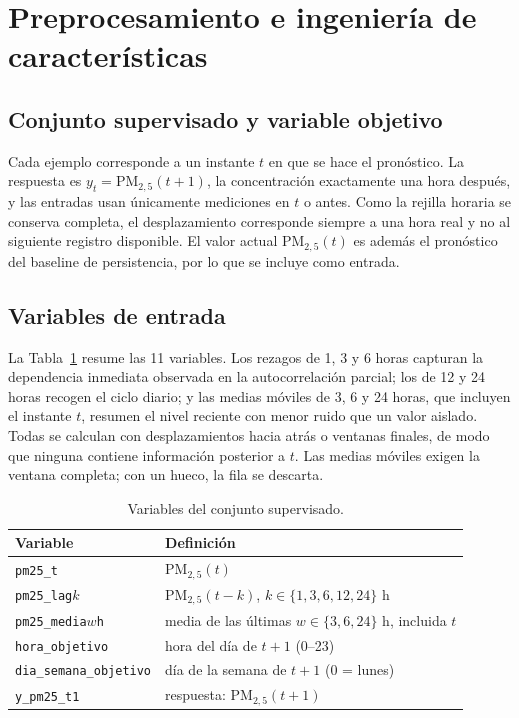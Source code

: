 
\section{Preprocesamiento e ingeniería de características}
\label{sec:preproc}

\subsection{Conjunto supervisado y variable objetivo}

Cada ejemplo corresponde a un instante $t$ en que se hace el pronóstico. La respuesta es $y_t=\mathrm{PM}_{2{,}5}(t+1)$, la concentración exactamente una hora después, y las entradas usan únicamente mediciones en $t$ o antes. Como la rejilla horaria se conserva completa, el desplazamiento corresponde siempre a una hora real y no al siguiente registro disponible. El valor actual $\mathrm{PM}_{2{,}5}(t)$ es además el pronóstico del baseline de persistencia, por lo que se incluye como entrada.

\subsection{Variables de entrada}

La Tabla~\ref{tab:vars} resume las 11 variables. Los rezagos de 1, 3 y 6 horas capturan la dependencia inmediata observada en la autocorrelación parcial; los de 12 y 24 horas recogen el ciclo diario; y las medias móviles de 3, 6 y 24 horas, que incluyen el instante $t$, resumen el nivel reciente con menor ruido que un valor aislado. Todas se calculan con desplazamientos hacia atrás o ventanas finales, de modo que ninguna contiene información posterior a $t$. Las medias móviles exigen la ventana completa; con un hueco, la fila se descarta.

\begin{table}[t]
\centering
\caption{Variables del conjunto supervisado.}
\label{tab:vars}
\small
\begin{tabular}{@{}p{3.45cm}p{3.95cm}@{}}
\toprule
Variable & Definición \\
\midrule
\texttt{pm25\_t} & $\mathrm{PM}_{2{,}5}(t)$ \\
\texttt{pm25\_lag$k$} & $\mathrm{PM}_{2{,}5}(t-k)$, $k\in\{1,3,6,12,24\}$ h \\
\texttt{pm25\_media$w$h} & media de las últimas $w\in\{3,6,24\}$ h, incluida $t$ \\
\texttt{hora\_objetivo} & hora del día de $t+1$ (0--23) \\
\texttt{dia\_semana\_objetivo} & día de la semana de $t+1$ (0 = lunes) \\
\midrule
\texttt{y\_pm25\_t1} & respuesta: $\mathrm{PM}_{2{,}5}(t+1)$ \\
\bottomrule
\end{tabular}
\end{table}

